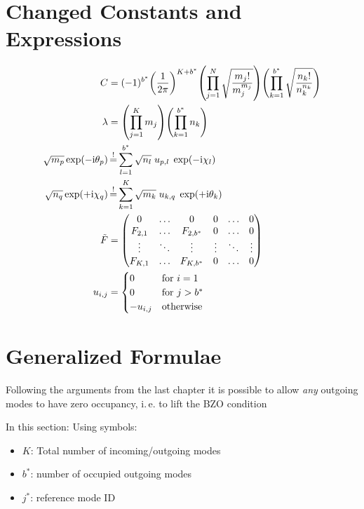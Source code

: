 \documentclass[
	english,
	a4paper,
	fontsize=10pt,
	parskip=half,
	titlepage=true,
	DIV=12,
	final
]{scrreprt}
\newcommand*{\ie}{i.\,e.\xspace}
\newcommand*{\iunit}{\ensuremath{\mathrm{i}}}
\newcommand*{\equalCond}{  \mathop{=}\limits^!  }
\begin{document}
\section{Changed Constants and Expressions}
\begin{align}
	C
&=
	(-1)^{b^*}
	\qty(
		\frac{1}{2\pi}
	)^{K + b^*}
	\qty( \prod_{j=1}^{N}
		\sqrt{\frac
			{ m_j! }
			{ m_j^{m_j} }
		}
	)
	\qty( \prod_{k=1}^{b^*}
		\sqrt{\frac
			{ n_k! }
			{ n_k^{n_k} }
		}
	)
\label{eqn:DefC_n}
\\
	\lambda
&=
	\qty( \prod_{j=1}^{K}   m_j )
	\qty( \prod_{k=1}^{b^*} n_k )
\label{eqn:DefLambda_n}
\\
	\sqrt{m_p} \exp(-\iunit \theta_p)
&\equalCond
	\sum_{l=1}^{b^*} \sqrt{n_l} \; u_{p,l} \; \exp(-\iunit\chi_l)
\label{eqn:FourierLinkForward_n}
\\
	\sqrt{n_q} \exp(+\iunit \chi_q)
&\equalCond
	\sum_{k=1}^{K}
	\sqrt{m_k} \; u_{k,q} \; \exp(+\iunit\theta_k)
\label{eqn:FourierLinkBackward_n}
\\
	\tilde{F}
&=
	\begin{pmatrix}
		0		& \ldots & 0				& 0		& \ldots & 0 \\
		F_{2,1}	& \ldots & F_{2, b^*}	& 0		& \ldots & 0 \\
		\vdots	& \ddots	 & \vdots		& \vdots	& \ddots & \vdots \\
		F_{K,1} & \ldots & F_{K, b^*}	& 0		& \ldots & 0
	\end{pmatrix}
\label{eqn:DefFTilda_n}
\\
	u_{i,j}
&=
	\begin{cases}
		0			& \text{for } i = 1 \\
		0			& \text{for } j > b^* \\
		-u_{i,j}		& \text{otherwise}
	\end{cases}
\label{eqn:DefReducedDFTNonBZO_n}
\end{align}

\section{Generalized Formulae}
Following the arguments from the last chapter it is possible to allow \emph{any} outgoing modes to have zero occupancy, \ie to lift the BZO condition

In this section: Using symbols:
\begin{itemize}
\item $K$: Total number of incoming/outgoing modes
\item $b^*$: number of occupied outgoing modes
\item $j^*$: reference mode ID
\end{itemize}
\end{document}
